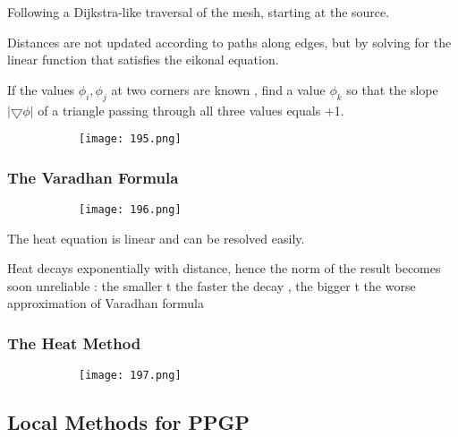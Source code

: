 \documentclass{article}
\begin{document}
Following a Dijkstra-like traversal of the mesh, starting at the source.

Distances are not updated according to paths along edges, but by solving for the linear function that satisfies the eikonal equation.

If the values $\phi_i,\phi_j$ at two corners are known , find a value $\phi_k$ so that the slope $|\bigtriangledown \phi|$ of a triangle passing through all three values equals +1.

 \begin{figure}[ht!]
  \centering
  \begin{subfigure}[b]{0.3\linewidth}
    \texttt{[image: 195.png]}
  \end{subfigure}
\end{figure}

\vspace{20mm}

\subsubsection{The Varadhan Formula}

 \begin{figure}[ht!]
  \centering
  \begin{subfigure}[b]{0.8\linewidth}
    \texttt{[image: 196.png]}
  \end{subfigure}
\end{figure}

The heat equation is linear and can be resolved easily.

Heat decays exponentially with distance, hence the norm of the result becomes soon unreliable : the smaller t the faster the decay , the bigger t the worse approximation of Varadhan formula

\subsubsection{The Heat Method}

 \begin{figure}[ht!]
  \centering
  \begin{subfigure}[b]{0.8\linewidth}
    \texttt{[image: 197.png]}
  \end{subfigure}
\end{figure}

\subsection{Local Methods for PPGP}
\end{document}
